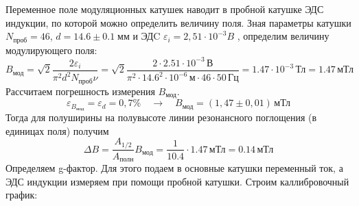 \documentclass[a4paper,12pt]{article}
\begin{document}
Переменное поле модуляционных катушек наводит в пробной катушке ЭДС индукции,
по которой можно определить величину поля. 
Зная параметры катушки $N_{проб} = 46$, $d = 14.6 \pm 0.1 \; \text{мм}$ и ЭДC $\varepsilon_i=2,51\cdot 10^{-3} B$ , определим величину модулирующего поля:
\begin{equation*}
    B_\text{мод} = \sqrt{2} \frac{2\varepsilon_i}{\pi^2 d^2N_{проб} \nu} = \sqrt{2} \frac{2 \cdot 2.51 \cdot 10^{-3}\, \text{В}}{\pi^2 \cdot 14.6^2 \cdot 10^{-6} \, \text{м} \cdot 46  \cdot 50\, \text{Гц}}  = 1.47 \cdot 10^{-3} \,\text{Тл} = 1.47 \, \text{мТл}
\end{equation*}
Рассчитаем погрешность измерения $B_\text{мод}$.
\begin{equation*}
    \varepsilon_{B_\text{мод}}=\varepsilon_d=0,7\%\quad\rightarrow\quad B_\text{мод}=(1,47\pm0,01)\,\text{мТл}
\end{equation*}
Тогда для полуширины на полувысоте линии резонансного поглощения (в единицах поля) получим
\begin{equation}
    \Delta B  = \frac{A_{1/2}}{A_{\text{полн}}} B_{\text{мод}} = \frac{1}{10.4}\cdot 1.47 \,\text{мТл} = 0.14 \,\text{мТл}  
\end{equation}
\newpage
Определяем g-фактор. Для этого подаем в основные катушки переменный ток,
а ЭДС индукции измеряем при помощи пробной катушки. Строим каллибровочный график:
\end{document}
